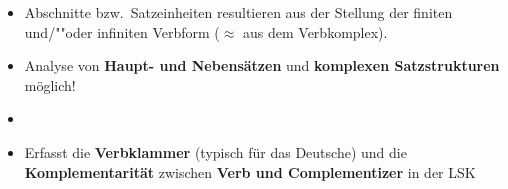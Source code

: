 \begin{frame}

\begin{itemize}
	\item Abschnitte bzw.\ Satzeinheiten resultieren aus der Stellung der finiten und/""oder infiniten Verbform ($\approx$ aus dem Verbkomplex).
\end{itemize}

\begin{table}
\centering
{}
\end{table}

\end{frame}


\begin{frame}

\begin{itemize}
	\item Analyse von \textbf{Haupt- und Nebensätzen} und \textbf{komplexen Satzstrukturen} möglich!
	\item[]
	\item Erfasst die \textbf{Verbklammer} (typisch für das Deutsche) und
	die \textbf{Komplementarität} zwischen \textbf{Verb und Complementizer} in der LSK
\end{itemize}

\begin{table}
\centering
{}
\end{table}

\end{frame}


